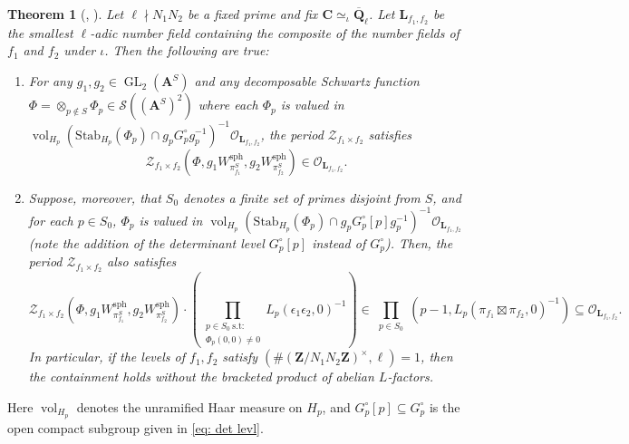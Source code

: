 \documentclass{amsart}%
\theoremstyle{plain}
\newtheorem{theorem}{Theorem}
\theoremstyle{plain}
\theoremstyle{remark}
\DeclareMathOperator{\GL}{GL}
\DeclareMathOperator{\vol}{vol}
\begin{document}
\begin{theorem}[, ]\label{thm intro B}
     Let $\ell\nmid N_1N_2$ be a fixed prime and fix $\mathbf{C}\simeq_\iota\overline{\mathbf{Q}}_\ell$. Let $\mathbf{L}_{f_1,f_2}$ be the smallest $\ell$-adic number field containing the composite of the number fields of $f_1$ and $f_2$ under $\iota$. Then the following are true: 
    \begin{enumerate}
        \item For any $g_1,g_2\in\GL_2(\mathbf{A}^S)$ and any decomposable Schwartz function $\Phi=\otimes_{p\not\in S}\Phi_p\in \mathcal{S}((\mathbf{A}^S)^2)$ where each $\Phi_p$ is valued in $\vol_{H_p}(\mathrm{Stab}_{H_p}(\Phi_p)\cap g_pG_p^\circ g_p^{-1})^{-1}\mathcal{O}_{\mathbf{L}_{f_1,f_2}}$, the period $\mathcal{Z}_{f_1\times f_2}$ satisfies $$\mathcal{Z}_{f_1\times f_2}\left(\Phi,g_1W_{\pi_{f_1}^S}^\mathrm{sph},g_2W_{\pi_{f_2}^S}^\mathrm{sph}\right)\in\mathcal{O}_{\mathbf{L}_{f_1,f_2}}.$$ 
        \item Suppose, moreover, that $S_0$ denotes a finite set of primes disjoint from $S$, and for each $p\in S_0$, $\Phi_p$ is valued in $\vol_{H_p}(\mathrm{Stab}_{H_p}(\Phi_p)\cap g_pG_p^\circ[p]g_p^{-1})^{-1}\mathcal{O}_{\mathbf{L}_{f_1,f_2}}$ \emph{(note the addition of the determinant level $G_p^\circ[p]$ instead of $G_p^\circ$)}. Then, the period $\mathcal{Z}_{f_1\times f_2}$ also satisfies
        $$ \mathcal{Z}_{f_1\times f_2}\left(\Phi,g_1W_{\pi_{f_1}^S}^\mathrm{sph},g_2W_{\pi_{f_2}^S}^\mathrm{sph}\right)\cdot \left(\prod_{\substack{p\in S_0\ \mathrm{s.t:}\\ \Phi_p(0,0)\neq 0}} L_p(\epsilon_1\epsilon_2,0)^{-1}\right)\in \prod_{\substack{p\in S_{0}}}\left(p-1,L_p(\pi_{f_1}\boxtimes \pi_{f_2},0)^{-1}\right)\subseteq\mathcal{O}_{\mathbf{L}_{f_1,f_2}}.$$
        In particular, if the levels of $f_1,f_2$ satisfy $(\#(\mathbf{Z}/N_1N_2\mathbf{Z})^\times,\ell)=1$, then the containment holds without the bracketed product of abelian $L$-factors.
    \end{enumerate}
    
\end{theorem}
\noindent 
Here $\vol_{H_p}$ denotes the unramified Haar measure on $H_p$, and $G_p^\circ[p]\subseteq G_p^\circ$ is the open compact subgroup given in \eqref{eq: det levl}.
\end{document}
